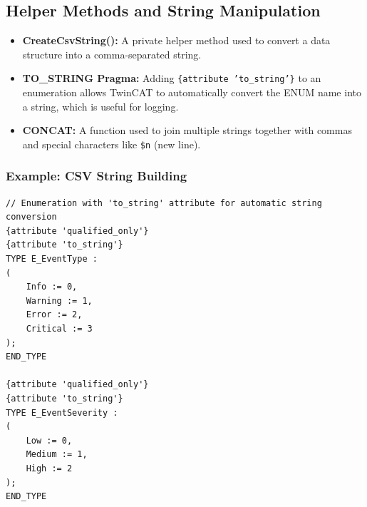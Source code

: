 \documentclass[11pt,a4paper]{article}
\begin{document}
\subsection{Helper Methods and String Manipulation}

\begin{itemize}[leftmargin=*]
    \item \textbf{CreateCsvString():} A private helper method used to convert a data structure into a comma-separated string.
    
    \item \textbf{TO\_STRING Pragma:} Adding \texttt{\{attribute 'to\_string'\}} to an enumeration allows TwinCAT to automatically convert the ENUM name into a string, which is useful for logging.
    
    \item \textbf{CONCAT:} A function used to join multiple strings together with commas and special characters like \texttt{\$n} (new line).
\end{itemize}

\subsubsection*{Example: CSV String Building}

\begin{lstlisting}
// Enumeration with 'to_string' attribute for automatic string conversion
{attribute 'qualified_only'}
{attribute 'to_string'}
TYPE E_EventType :
(
    Info := 0,
    Warning := 1,
    Error := 2,
    Critical := 3
);
END_TYPE

{attribute 'qualified_only'}
{attribute 'to_string'}
TYPE E_EventSeverity :
(
    Low := 0,
    Medium := 1,
    High := 2
);
END_TYPE
\end{lstlisting}
\end{document}
